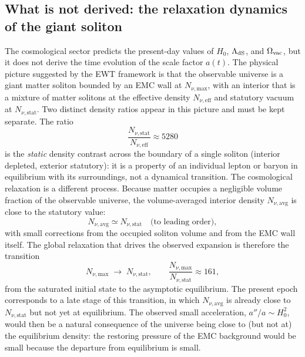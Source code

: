 \documentclass[10pt,a4paper]{article}
\begin{document}
\subsection{What is not derived: the relaxation dynamics of the giant soliton}
\label{sec:cosmo_dynamics_open}

The cosmological sector predicts the present-day values of \(H_0\),
\(\Lambda_{\rm dS}\), and \(\Omega_{\rm vac}\), but it does not
derive the time evolution of the scale factor \(a(t)\). The
physical picture suggested by the EWT framework is that the
observable universe is a giant matter soliton bounded by an EMC
wall at \(N_{\nu,\text{max}}\), with an interior that is a mixture
of matter solitons at the effective density \(N_{\nu,\text{eff}}\)
and statutory vacuum at \(N_{\nu,\text{stat}}\). Two distinct
density ratios appear in this picture and must be kept separate.
The ratio
\begin{equation}
	\frac{N_{\nu,\text{stat}}}{N_{\nu,\text{eff}}}
	\approx 5280
	\label{eq:cosmo_ratio_single}
\end{equation}
is the \emph{static} density contrast across the boundary of a
single soliton (interior depleted, exterior statutory): it is a
property of an individual lepton or baryon in equilibrium with its
surroundings, not a dynamical transition. The cosmological
relaxation is a different process. Because matter occupies a
negligible volume fraction of the observable universe, the
volume-averaged interior density \(N_{\nu,\text{avg}}\) is close to
the statutory value:
\begin{equation}
	N_{\nu,\text{avg}}
	\simeq N_{\nu,\text{stat}}
	\quad\text{(to leading order)},
	\label{eq:cosmo_Navg}
\end{equation}
with small corrections from the occupied soliton volume and from
the EMC wall itself. The global relaxation that drives the observed
expansion is therefore the transition
\begin{equation}
	N_{\nu,\text{max}}
	\;\longrightarrow\;
	N_{\nu,\text{stat}},
	\qquad
	\frac{N_{\nu,\text{max}}}{N_{\nu,\text{stat}}}
	\approx 161,
	\label{eq:cosmo_relaxation}
\end{equation}
from the saturated initial state to the asymptotic equilibrium. The
present epoch corresponds to a late stage of this transition, in
which \(N_{\nu,\text{avg}}\) is already close to
\(N_{\nu,\text{stat}}\) but not yet at equilibrium. The observed
small acceleration, \(a''/a \sim H_0^2\), would then be a natural
consequence of the universe being close to (but not at) the
equilibrium density: the restoring pressure of the EMC background
would be small because the departure from equilibrium is small.
\end{document}
